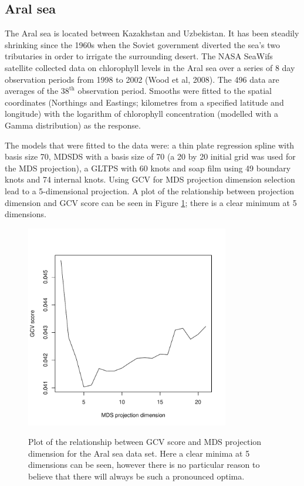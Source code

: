 \documentclass[useAMS, referee]{biom}
\begin{document}
\subsection{Aral sea}

The Aral sea is located between Kazakhstan and Uzbekistan. It has been steadily shrinking since the 1960s when the Soviet government diverted the sea's two tributaries in order to irrigate the surrounding desert. The NASA SeaWifs satellite collected data on chlorophyll levels in the Aral sea over a series of 8 day observation periods from 1998 to 2002 (Wood et al, 2008). The 496 data are averages of the $38^\text{th}$ observation period. Smooths were fitted to the spatial coordinates (Northings and Eastings; kilometres from a specified latitude and longitude) with the logarithm of chlorophyll concentration (modelled with a Gamma distribution) as the response.

The models that were fitted to the data were: a thin plate regression spline with basis size 70, MDSDS with a basis size of 70 (a 20 by 20 initial grid was used for the MDS projection), a GLTPS with 60 knots and soap film using 49 boundary knots and 74 internal knots. Using GCV for MDS projection dimension selection lead to a 5-dimensional projection. A plot of the relationship between projection dimension and GCV score can be seen in Figure \ref{aral-gcvplot}; there is a clear minimum at 5 dimensions.

\begin{figure}
\centering
\includegraphics[width=3.5in]{examples/aral/aral-gcvplot.pdf} \\
\caption{Plot of the relationship between GCV score and MDS projection dimension for the Aral sea data set. Here a clear minima at 5 dimensions can be seen, however there is no particular reason to believe that there will always be such a pronounced optima.}
\label{aral-gcvplot}
\end{figure}
\end{document}
